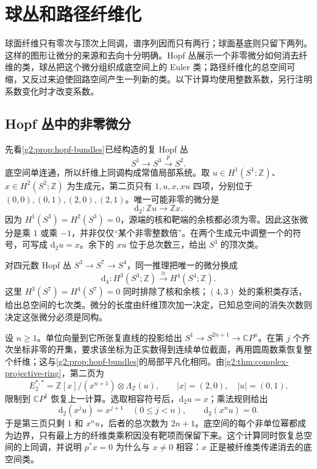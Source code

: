
% 
% 

\section{球丛和路径纤维化}
\label{g2:sec:1103}

球面纤维只有零次与顶次上同调，谱序列因而只有两行；球面基底则只留下两列。这样的图形让微分的来源和去向十分明确。Hopf 丛展示一个非零微分如何消去纤维的类，球丛把这个微分组织成底空间上的 Euler 类；路径纤维化的总空间可缩，又反过来迫使回路空间产生一列新的类。以下计算均使用整数系数，另行注明系数变化时才改变系数。

\subsection{Hopf 丛中的非零微分}
\label{g2:subsec:1103:01}
先看\cref{g2:prop:hopf-bundles}已经构造的复 Hopf 丛
\[
	S^1\longrightarrow S^3\xrightarrow{p}S^2.
\]
底空间单连通，所以纤维上同调构成常值局部系统。取 \(u\in H^1(S^1;\mathbb Z)\)、\(x\in H^2(S^2;\mathbb Z)\) 为生成元，第二页只有 \(1,u,x,xu\) 四项，分别位于 \((0,0),(0,1),(2,0),(2,1)\)。唯一可能非零的微分是
\[
	\mathrm d_2:\mathbb Zu\longrightarrow\mathbb Zx.
\]
因为 \(H^1(S^3)=H^2(S^3)=0\)，源端的核和靶端的余核都必须为零。因此这张微分是乘 \(1\) 或乘 \(-1\)，并非仅仅“某个非零整数倍”。在两个生成元中调整一个的符号，可写成 \(\mathrm d_2u=x\)。余下的 \(xu\) 位于总次数三，给出 \(S^3\) 的顶次类。

\ProseParagraphBreak

对四元数 Hopf 丛 \(S^3\to S^7\to S^4\)，同一推理把唯一的微分换成
\[
	\mathrm d_4:H^3(S^3;\mathbb Z)\xrightarrow{\cong}H^4(S^4;\mathbb Z).
\]
这里 \(H^3(S^7)=H^4(S^7)=0\) 同时排除了核和余核；\((4,3)\) 处的乘积类存活，给出总空间的七次类。微分的长度由纤维顶次加一决定，已知总空间的消失次数则决定这张微分必须是同构。

\begin{example}\label{g2:exm:serre-complex-hopf}
	设 \(n\ge1\)。单位向量到它所张复直线的投影给出 \(S^1\to S^{2n+1}\to\mathbb CP^n\)。在第 \(j\) 个齐次坐标非零的开集，要求该坐标为正实数得到连续单位截面，再用圆周数乘恢复整个纤维；这与\cref{g2:prop:hopf-bundles}的局部平凡化相同。由\cref{g2:thm:complex-projective-ring}，第二页为
	\[
		E_2^{*,*}=\mathbb Z[x]/(x^{n+1})\otimes\Lambda_{\mathbb Z}(u),\qquad |x|=(2,0),\quad |u|=(0,1).
	\]
	限制到 \(\mathbb CP^1\) 恢复上一计算。选取相容符号后，\(\mathrm d_2u=x\)；乘法规则给出
	\[
		\mathrm d_2(x^ju)=x^{j+1}\quad(0\le j<n),\qquad \mathrm d_2(x^nu)=0.
	\]
	于是第三页只剩 \(1\) 和 \(x^nu\)，后者的总次数为 \(2n+1\)。底空间的每个非单位幂都成为边界，只有最上方的纤维类乘积因没有靶项而保留下来。这个计算同时恢复总空间的上同调，并说明 \(p^*x=0\) 为什么与 \(x\ne0\) 相容：\(x\) 正是被纤维类传递消去的底空间类。
\end{example}

